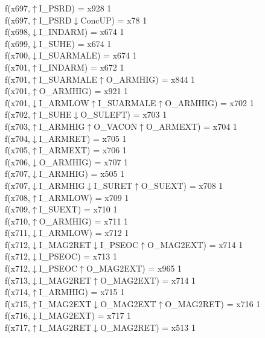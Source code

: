 f(x697,$\uparrow$I\_PSRD) = x928 {1} \\
f(x697,$\uparrow$I\_PSRD$\downarrow$ConcUP) = x78 {1} \\
f(x698,$\downarrow$I\_INDARM) = x674 {1} \\
f(x699,$\downarrow$I\_SUHE) = x674 {1} \\
f(x700,$\downarrow$I\_SUARMALE) = x674 {1} \\
f(x701,$\uparrow$I\_INDARM) = x672 {1} \\
f(x701,$\uparrow$I\_SUARMALE$\uparrow$O\_ARMHIG) = x844 {1} \\
f(x701,$\uparrow$O\_ARMHIG) = x921 {1} \\
f(x701,$\downarrow$I\_ARMLOW$\uparrow$I\_SUARMALE$\uparrow$O\_ARMHIG) = x702 {1} \\
f(x702,$\uparrow$I\_SUHE$\downarrow$O\_SULEFT) = x703 {1} \\
f(x703,$\uparrow$I\_ARMHIG$\uparrow$O\_VACON$\uparrow$O\_ARMEXT) = x704 {1} \\
f(x704,$\downarrow$I\_ARMRET) = x705 {1} \\
f(x705,$\uparrow$I\_ARMEXT) = x706 {1} \\
f(x706,$\downarrow$O\_ARMHIG) = x707 {1} \\
f(x707,$\downarrow$I\_ARMHIG) = x505 {1} \\
f(x707,$\downarrow$I\_ARMHIG$\downarrow$I\_SURET$\uparrow$O\_SUEXT) = x708 {1} \\
f(x708,$\uparrow$I\_ARMLOW) = x709 {1} \\
f(x709,$\uparrow$I\_SUEXT) = x710 {1} \\
f(x710,$\uparrow$O\_ARMHIG) = x711 {1} \\
f(x711,$\downarrow$I\_ARMLOW) = x712 {1} \\
f(x712,$\downarrow$I\_MAG2RET$\downarrow$I\_PSEOC$\uparrow$O\_MAG2EXT) = x714 {1} \\
f(x712,$\downarrow$I\_PSEOC) = x713 {1} \\
f(x712,$\downarrow$I\_PSEOC$\uparrow$O\_MAG2EXT) = x965 {1} \\
f(x713,$\downarrow$I\_MAG2RET$\uparrow$O\_MAG2EXT) = x714 {1} \\
f(x714,$\uparrow$I\_ARMHIG) = x715 {1} \\
f(x715,$\uparrow$I\_MAG2EXT$\downarrow$O\_MAG2EXT$\uparrow$O\_MAG2RET) = x716 {1} \\
f(x716,$\downarrow$I\_MAG2EXT) = x717 {1} \\
f(x717,$\uparrow$I\_MAG2RET$\downarrow$O\_MAG2RET) = x513 {1} \\
